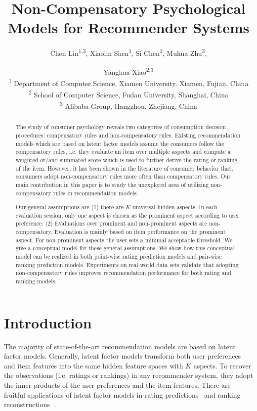 \documentclass[letterpaper]{article} %
\begin{document}
\title{Non-Compensatory Psychological Models for Recommender Systems}
\author{Chen Lin\textsuperscript{1,3}, Xiaolin Shen\textsuperscript{1}, Si Chen\textsuperscript{1}, Muhua Zhu\textsuperscript{3}, \and Yanghua Xiao\textsuperscript{2,3}\\
\textsuperscript{1} Department of Computer Science, Xiamen University, Xiamen, Fujian, China\\
\textsuperscript{2} School of Computer Science, Fudan University, Shanghai, China \\
\textsuperscript{3} Alibaba Group, Hangzhou, Zhejiang, China
}
\maketitle
\begin{abstract}
The study of consumer psychology reveals two categories of consumption decision procedures: compensatory rules and non-compensatory rules. Existing recommendation models which are based on latent factor models assume the consumers follow the compensatory rules, i.e. they evaluate an item over multiple aspects and compute a weighted or/and summated score which is used to further derive the rating or ranking of the item. However, it has been shown in the literature of consumer behavior that, consumers adopt non-compensatory rules more often than compensatory rules. Our main contribution in this paper is to study the unexplored area of utilizing non-compensatory rules in recommendation models. 

Our general assumptions are (1) there are $K$ universal hidden aspects. In each evaluation session, only one aspect is chosen as the prominent aspect according to user preference. (2) Evaluations over prominent and non-prominent aspects are non-compensatory. Evaluation is mainly based on item performance on the prominent aspect. For non-prominent aspects the user sets a minimal acceptable threshold. We give a conceptual model for these general assumptions. We show how this conceptual model can be realized in both point-wise rating prediction models and pair-wise ranking prediction models. Experiments on real-world data sets validate that adopting non-compensatory rules improves recommendation performance for both rating and ranking models.
\end{abstract}


\section{Introduction}\label{sec:introduction}
The majority of state-of-the-art recommendation models are based on latent factor models. Generally, latent factor models transform both user preferences and item features into the same hidden feature spaces with $K$ aspects. To recover the observations (i.e. ratings or rankings) in any recommender system, they adopt the inner products of the user preferences and the item features. There are fruitful applications of latent factor models in  rating predictions~\cite{Koren2009Matrix,Koren2010Factor,Lee2014Local} and ranking reconstructions~\cite{Rendle2009BPR,Steck2015Gaussian,Zhao2018Factored,Shi2010List}.   
\end{document}
